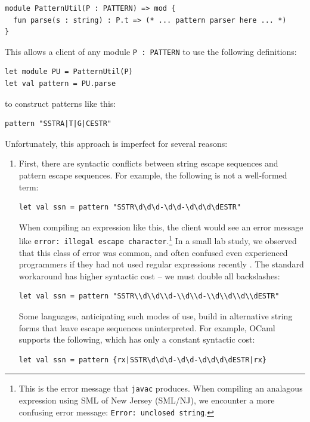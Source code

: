 \begin{lstlisting}[numbers=none]
module PatternUtil(P : PATTERN) => mod {
  fun parse(s : string) : P.t => (* ... pattern parser here ... *)
}
\end{lstlisting}
This allows a client of any module \lstinline{P : PATTERN} to use the following definitions:
\begin{lstlisting}[numbers=none]
let module PU = PatternUtil(P)
let val pattern = PU.parse
\end{lstlisting}
to construct patterns like this:
\begin{lstlisting}[numbers=none]
pattern "SSTRA|T|G|CESTR"
\end{lstlisting}
Unfortunately, this approach is imperfect for several reasons:
\begin{enumerate} 
\item First, there are syntactic conflicts between string escape sequences and pattern escape sequences. For example, the following is not a well-formed term:
\begin{lstlisting}[numbers=none,mathescape=|]
let val ssn = pattern "SSTR\d\d\d-\d\d-\d\d\d\dESTR"
\end{lstlisting}
When compiling an expression like this, the client would see an error message like \verb|error: illegal escape character|.\footnote{This is the error message that \texttt{javac} produces. When compiling an analagous expression using SML of New Jersey (SML/NJ), we encounter a more confusing error message: \texttt{Error: unclosed string}.} In a small lab study, we observed that this class of error was common, and often confused even experienced programmers if they had not used regular expressions recently \cite{Omar:2012:ACC:2337223.2337324}. The standard workaround has higher syntactic cost -- we must double all backslashes:
\begin{lstlisting}[numbers=none]
let val ssn = pattern "SSTR\\d\\d\\d-\\d\\d-\\d\\d\\d\\dESTR"
\end{lstlisting}

Some languages, anticipating such modes of use, build in alternative string forms that leave escape sequences uninterpreted. For example, OCaml supports the following, which has only a constant syntactic cost:
\begin{lstlisting}[numbers=none]
let val ssn = pattern {rx|SSTR\d\d\d-\d\d-\d\d\d\dESTR|rx}
\end{lstlisting}


\end{enumerate}
